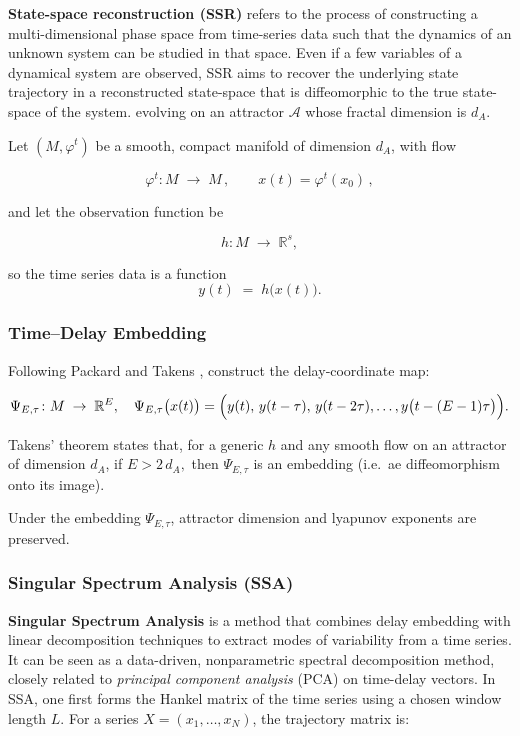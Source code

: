 \documentclass[14pt]{extarticle}
\begin{document}
	\textbf{State-space reconstruction (SSR)} refers to the process of constructing a multi-dimensional phase space from time-series data such that the dynamics of an unknown system can be studied in that space. 
	Even if a few variables of a dynamical system are observed, SSR aims to recover the underlying state trajectory  in a reconstructed state-space that is diffeomorphic to the true state-space of the system.
	evolving on an attractor $\mathcal{A}$ whose fractal dimension is $d_A$.  
	
	Let $(M, \varphi^t)$ be a smooth, compact manifold of dimension $d_A$, with flow
	
	$$
	\varphi^t\colon M\;\to\;M\,,\qquad x(t)=\varphi^t(x_0)\,,
	$$
	
	and let the observation function be
	
	$$
	h\colon M\;\to\;\mathbb{R}^s, 
	$$
	
	so the time series data is a function $$ y(t)\;=\;h\bigl(x(t)\bigr). $$
	
	\subsubsection{Time–Delay Embedding}
	
	Following Packard \citep{Packard1980} and Takens \citep{Takens1981}, construct the delay‐coordinate map:
	
	$$
	\Psi_{E,\tau}\colon M\;\to\;\mathbb{R}^E,
	\quad
	\Psi_{E,\tau}\bigl(x(t)\bigr)
	=\Bigl(y(t),\,y(t-\tau),\,y(t-2\tau),\dots,y\bigl(t-(E-1)\tau\bigr)\Bigr).
	$$
	
	Takens’ theorem states that, for a generic $h$ and any smooth flow on an attractor of dimension $d_A$, if $E > 2\,d_A,$ then $\Psi_{E,\tau}$ is an embedding (i.e.\ ae diffeomorphism onto its image).
	
	Under the embedding $\Psi_{E,\tau}$, attractor dimension and lyapunov exponents are preserved.
	
	\subsubsection{Singular Spectrum Analysis (SSA)}
	
	\textbf{Singular Spectrum Analysis} is a method that combines delay embedding with linear decomposition techniques to extract modes of variability from a time series. It can be seen as a data-driven, nonparametric spectral decomposition method, closely related to \textit{principal component analysis} (PCA) on time-delay vectors. In SSA, one first forms the Hankel matrix of the time series using a chosen window length $L$. For a series $X = (x_1, \dots, x_N)$, the trajectory matrix is: 
	
\end{document}
